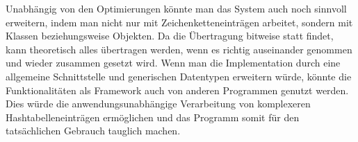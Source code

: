 \documentclass{scrreprt}
\begin{document}
Unabhängig von den Optimierungen könnte man das System auch noch sinnvoll erweitern, indem man nicht nur mit Zeichenketteneinträgen arbeitet, sondern mit Klassen beziehungsweise Objekten. Da die Übertragung bitweise statt findet, kann theoretisch alles übertragen werden, wenn es richtig auseinander genommen und wieder zusammen gesetzt wird. Wenn man die Implementation durch eine allgemeine Schnittstelle und generischen Datentypen erweitern würde, könnte die Funktionalitäten als Framework auch von anderen Programmen genutzt werden. Dies würde die anwendungsunabhängige Verarbeitung von komplexeren Hashtabelleneinträgen ermöglichen und das Programm somit für den tatsächlichen Gebrauch tauglich machen.

\nocite{*}
\printbibliography
{}

\listoffigures
{}
 
\listoftables
{}
\end{document}
